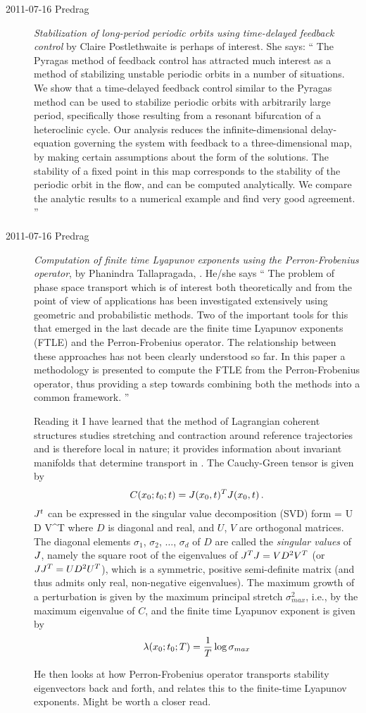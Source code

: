 \begin{description}
\item[2011-07-16 Predrag]
{\em Stabilization of long-period periodic orbits
    using time-delayed feedback control} by Claire
    Postlethwaite
is perhaps of interest. She says: ``
The Pyragas method of feedback control has attracted much interest as a method of stabilizing unstable periodic orbits in a number of situations. We show that a time-delayed feedback control similar to the Pyragas method can be used to stabilize periodic orbits with arbitrarily large period, specifically those resulting from a resonant bifurcation of a heteroclinic cycle. Our analysis reduces the infinite-dimensional delay-equation governing the system with feedback to a three-dimensional map, by making certain assumptions about the form of the solutions. The stability of a fixed point in this map corresponds to the stability of the periodic orbit in the flow, and can be computed analytically. We compare the analytic results to a numerical example and find very good agreement.
''

\item[2011-07-16 Predrag]
{\em Computation of finite time {Lyapunov} exponents using the {Perron-Frobenius} operator}, by
Phanindra Tallapragada, . He/she says
``
    The problem of phase space transport which is of interest both theoretically and from the point of view of applications has been investigated extensively using geometric and probabilistic methods. Two of the important tools for this that emerged in the last decade are the finite time Lyapunov exponents (FTLE) and the Perron-Frobenius operator. The relationship between these approaches has not been clearly understood so far. In this paper a methodology is presented to compute the FTLE from the Perron-Frobenius operator, thus providing a step towards combining both the methods into a common framework.
''

                                                    \toCB
Reading it I have learned that the method of Lagrangian
coherent structures studies stretching and contraction around reference trajectories and is therefore local in nature; it provides information about invariant manifolds that determine transport in
\statesp. The Cauchy-Green tensor is given by
\[
C({x_0}; t_0; t) = J({x_0},t)^T J({x_0},t)
\,.
\]
$J^t$ can be expressed in the singular value decomposition (SVD) form
\beq
\jMps = {U} {D}  {V}^T
where ${D}$ is diagonal and real, and ${U}$, ${V}$ are orthogonal
matrices. The diagonal elements
$\sigma_{1}$, $\sigma_{2}$, $\dots$, $\sigma_{d}$ of ${D}$ are called the
\emph{singular values} of $\jMps$, namely the square root of the
eigenvalues of $\jMps^{T}\jMps = {V}{D}^{2}{V}^T$ (or $\jMps\jMps^{T} =
{U}{D}^{2}{U}^T$), which is a symmetric, positive semi-definite matrix
(and thus admits only real, non-negative eigenvalues).
The maximum growth of a
perturbation is given by the maximum principal stretch 
\(
\sigma_{max}^2
\), i.e., by the maximum eigenvalue of $C$,
and the finite time Lyapunov exponent is given by 
\[
\Lyap(\xInit; t_0; T) = \frac{1}{T} \log \sigma_{max}
\]

He then looks at how Perron-Frobenius operator transports 
stability eigenvectors back and forth, and relates this to 
the finite-time Lyapunov exponents. Might be worth a closer read.
\end{description}

\renewcommand{\ssp}{a}
